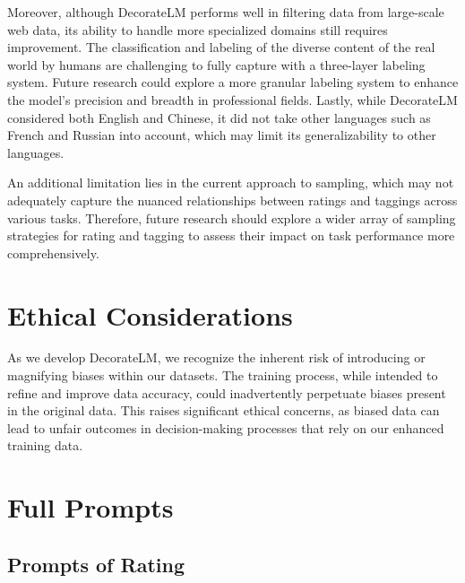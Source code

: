 \documentclass[11pt]{article}
\begin{document}
Moreover, although DecorateLM performs well in filtering data from large-scale web data, its ability to handle more specialized domains still requires improvement. The classification and labeling of the diverse content of the real world by humans are challenging to fully capture with a three-layer labeling system. Future research could explore a more granular labeling system to enhance the model's precision and breadth in professional fields.
Lastly, while DecorateLM considered both English and Chinese, it did not take other languages such as French and Russian into account, which may limit its generalizability to other languages.

An additional limitation lies in the current approach to sampling, which may not adequately capture the nuanced relationships between ratings and taggings across various tasks. Therefore, future research should explore a wider array of sampling strategies for rating and tagging to assess their impact on task performance more comprehensively. 

\section{Ethical Considerations}

As we develop DecorateLM, we recognize the inherent risk of introducing or magnifying biases within our datasets. The training process, while intended to refine and improve data accuracy, could inadvertently perpetuate biases present in the original data. This raises significant ethical concerns, as biased data can lead to unfair outcomes in decision-making processes that rely on our enhanced training data.




%


\appendix

\newpage
\section{Full Prompts}
\subsection{Prompts of Rating}
\label{rating prompt}

\end{document}
